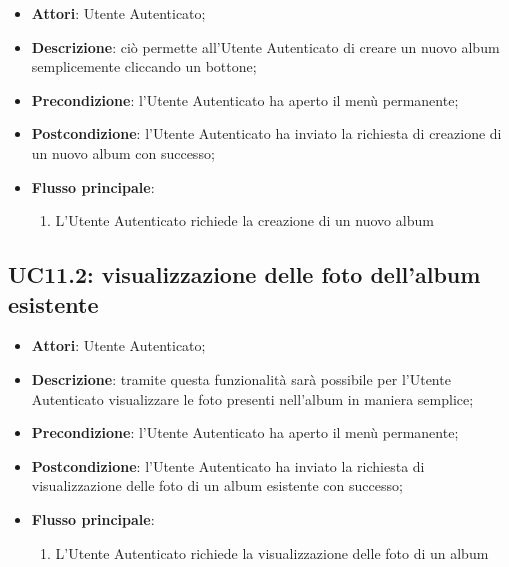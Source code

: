 \begin{itemize}
  \item \textbf{Attori}: Utente Autenticato;
  \item \textbf{Descrizione}: ciò permette all'Utente Autenticato di creare un
nuovo album semplicemente cliccando un bottone;
  \item \textbf{Precondizione}: l'Utente Autenticato ha aperto il menù
permanente;
  \item \textbf{Postcondizione}: l'Utente Autenticato ha inviato la richiesta
di creazione di un nuovo album con successo;
  \item \textbf{Flusso principale}:
  \begin{enumerate}
    \item L'Utente Autenticato richiede la creazione di un nuovo album
  \end{enumerate}
\end{itemize}



\subsection{UC11.2: visualizzazione delle foto dell'album esistente}
\label{uc:uc11.2}
\hypertarget{UC11.2}{}

\begin{itemize}
  \item \textbf{Attori}: Utente Autenticato;
  \item \textbf{Descrizione}: tramite questa funzionalità sarà possibile per
l'Utente Autenticato visualizzare le foto presenti nell'album in maniera
semplice;
  \item \textbf{Precondizione}: l'Utente Autenticato ha aperto il menù
permanente;
  \item \textbf{Postcondizione}: l'Utente Autenticato ha inviato la richiesta
di visualizzazione delle foto di un album esistente con successo;
  \item \textbf{Flusso principale}:
  \begin{enumerate}
    \item L'Utente Autenticato richiede la visualizzazione delle foto di un
album
  \end{enumerate}
\end{itemize}


%

